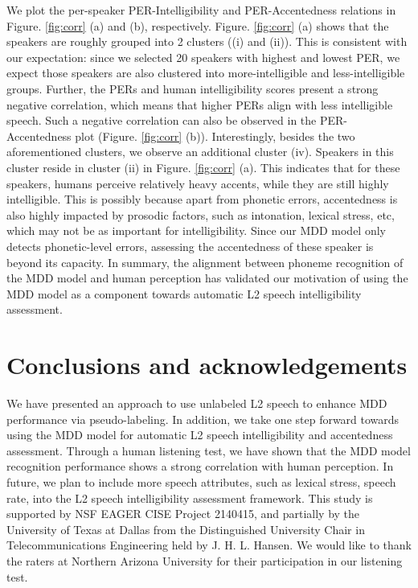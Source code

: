 \documentclass[a4paper]{article}
\begin{document}
We plot the per-speaker PER-Intelligibility and PER-Accentedness relations in Figure. \ref{fig:corr} (a) and (b), respectively. Figure. \ref{fig:corr} (a) shows that the speakers are roughly grouped into 2 clusters ((i) and (ii)). This is consistent with our expectation: since we selected 20 speakers with highest and lowest PER, we expect those speakers are also clustered into more-intelligible and less-intelligible groups. Further, the PERs and human intelligibility scores present a strong negative correlation, which means that higher PERs align with less intelligible speech. Such a negative correlation can also be observed in the PER-Accentedness plot (Figure. \ref{fig:corr} (b)). Interestingly, besides the two aforementioned clusters, we observe an additional cluster (iv). Speakers in this cluster reside in cluster (ii) in  Figure. \ref{fig:corr} (a). This indicates that for these speakers, humans perceive relatively heavy accents, while they are still highly intelligible. This is possibly because apart from phonetic errors, accentedness is also highly impacted by prosodic factors, such as intonation, lexical stress, etc, which may not be as important for intelligibility. Since our MDD model only detects phonetic-level errors, assessing the accentedness of these speaker is beyond its capacity. In summary, the alignment between phoneme recognition of the MDD model and human perception has validated our motivation of using the MDD model as a component towards automatic L2 speech intelligibility assessment. 

\section{Conclusions and acknowledgements}

We have presented an approach to use unlabeled L2 speech to enhance MDD performance via pseudo-labeling. In addition, we take one step forward towards using the MDD model for automatic L2 speech intelligibility and accentedness assessment. Through a human listening test, we have shown that the MDD model recognition performance shows a strong correlation with human perception. In future, we plan to include more speech attributes, such as lexical stress, speech rate, into the L2 speech intelligibility assessment framework. This study is supported by NSF EAGER CISE Project 2140415, and partially by the University of Texas at
Dallas from the Distinguished University Chair in Telecommunications Engineering held by J. H. L. Hansen. We would like to thank the raters at Northern Arizona University for their participation in our listening test.




\pagebreak



\end{document}
